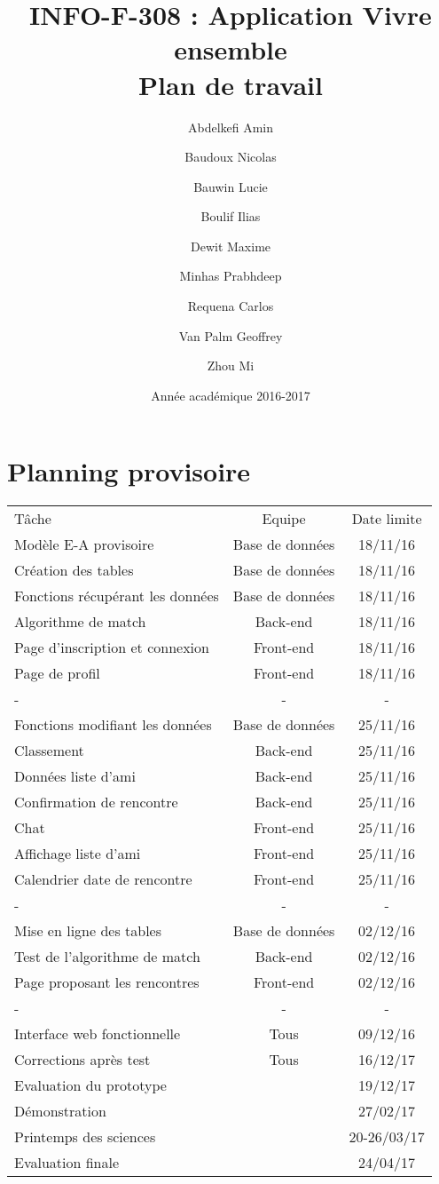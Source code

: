 \documentclass[10pt]{article}
\title{INFO-F-308 : Application Vivre ensemble \\ Plan de travail}
\author{Abdelkefi Amin \and Baudoux Nicolas \and Bauwin Lucie \and Boulif Ilias \and Dewit Maxime \and  Minhas Prabhdeep \and Requena Carlos \and Van Palm Geoffrey \and Zhou Mi}
\date{Année académique 2016-2017}
\begin{document}
 
 \maketitle
 \newpage
 \section{Planning provisoire}
  \begin{center}
  \begin{tabular}{ l | c | c }
   Tâche & Equipe & Date limite \\
   Modèle E-A provisoire & Base de données & 18/11/16\\ %
   Création des tables & Base de données & 18/11/16\\
   Fonctions récupérant les données & Base de données & 18/11/16\\
   Algorithme de match & Back-end & 18/11/16\\
   Page d'inscription et connexion & Front-end & 18/11/16\\
   Page de profil & Front-end & 18/11/16\\
   - & - & -\\
   Fonctions modifiant les données & Base de données & 25/11/16\\
   Classement & Back-end & 25/11/16\\
   Données liste d'ami & Back-end & 25/11/16\\
   Confirmation de rencontre & Back-end & 25/11/16\\
   Chat & Front-end & 25/11/16\\
   Affichage liste d'ami & Front-end & 25/11/16\\
   Calendrier date de rencontre & Front-end & 25/11/16\\
   - & - & -\\
   Mise en ligne des tables & Base de données & 02/12/16\\
   Test de l'algorithme de match & Back-end & 02/12/16\\
   Page proposant les rencontres & Front-end & 02/12/16\\
   - & - & -\\
   Interface web fonctionnelle & Tous & 09/12/16\\
   Corrections après test & Tous & 16/12/17\\
   Evaluation du prototype & & 19/12/17\\
   Démonstration & & 27/02/17\\
   Printemps des sciences & & 20-26/03/17\\
   Evaluation finale & & 24/04/17\\ 
  \end{tabular}
  \end{center}
 
\end{document}
